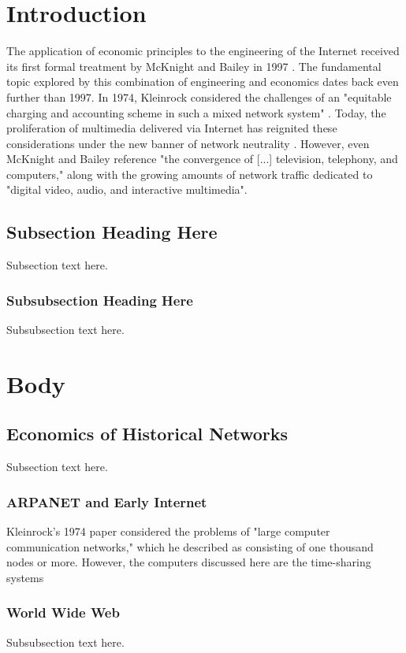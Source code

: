 \documentclass[conference]{IEEEtran}
\begin{document}
\section{Introduction}
The application of economic principles to the engineering of the Internet received its first formal treatment by McKnight and Bailey in 1997 \cite{mcknightbailey97}. The fundamental topic explored by this combination of engineering and economics dates back even further than 1997. In 1974, Kleinrock considered the challenges of an "equitable charging and accounting scheme in such a mixed network system" \cite{kleinrock74}. Today, the proliferation of multimedia delivered via Internet has reignited these considerations under the new banner of network neutrality \cite{faulhaber11}. However, even McKnight and Bailey reference "the convergence of [...] television, telephony, and computers," along with the growing amounts of network traffic dedicated to "digital video, audio, and interactive multimedia".

\subsection{Subsection Heading Here}
Subsection text here.

\subsubsection{Subsubsection Heading Here}
Subsubsection text here.

\section{Body}

\subsection{Economics of Historical Networks}
Subsection text here.

\subsubsection{ARPANET and Early Internet}
Kleinrock's 1974 paper considered the problems of "large computer communication networks," which he described as consisting of one thousand nodes or more. However, the computers discussed here are the time-sharing systems

\subsubsection{World Wide Web}
Subsubsection text here.
\end{document}
